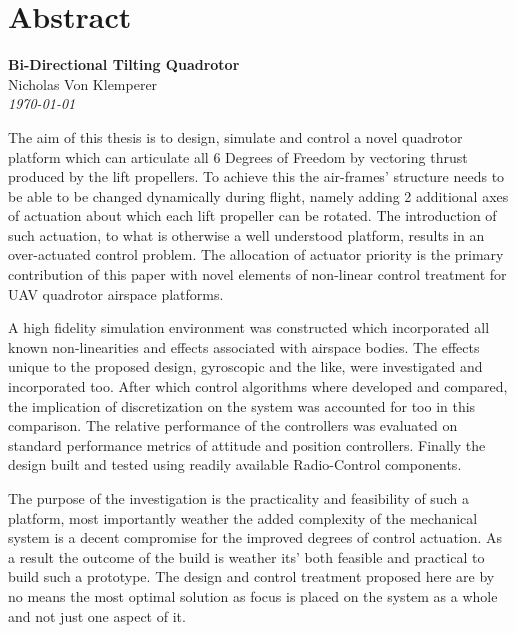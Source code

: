 \documentclass[a4paper, 11pt, oneside, openright, parskip=full]{book}
\newcommand{\auth}{Nicholas Von Klemperer}								%
\newcommand{\titl}{Bi-Directional Tilting Quadrotor}						%
\begin{document}
\chapter{Abstract}				
\label{ch:abs}
\begin{center}
	\textbf{\Large \titl}\\
			\vskip 0.2cm
			\auth\\
			\vskip 0.2cm
	\textit{\footnotesize\today}
			\vskip 1cm
\end{center}
The aim of this thesis is to design, simulate and control a novel quadrotor platform which can articulate all 6 Degrees of Freedom by vectoring thrust produced by the lift propellers. To achieve this the air-frames' structure needs to be able to be changed dynamically during flight, namely adding 2 additional axes of actuation about which each lift propeller can be rotated. The introduction of such actuation, to what is otherwise a well understood platform, results in an over-actuated control problem. The allocation of actuator priority is the primary contribution of this paper with novel elements of non-linear control treatment for UAV quadrotor airspace platforms.
\par
A high fidelity simulation environment was constructed which incorporated all known non-linearities and effects associated with airspace bodies. The effects unique to the proposed design, gyroscopic and the like, were investigated and incorporated too. After which control algorithms where developed and compared, the implication of discretization on the system was accounted for too in this comparison. The relative performance of the controllers was evaluated on standard performance metrics of attitude and position controllers. Finally the design built and tested using readily available Radio-Control components.
\par
The purpose of the investigation is the practicality and feasibility of such a platform, most importantly weather the added complexity of the mechanical system is a decent compromise for the improved degrees of control actuation. As a result the outcome of the build is weather its' both feasible and practical to build such a prototype. The design and control treatment proposed here are by no means the most optimal solution as focus is placed on the system as a whole and not just one aspect of it.
\end{document}
